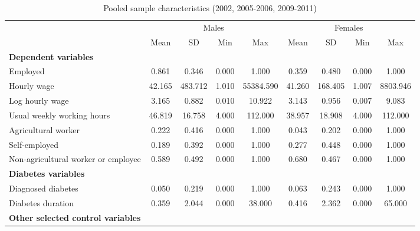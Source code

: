 \documentclass[12pt,english,british]{article}
\newcommand{\sym}[1]{\rlap{#1}}%
\begin{document}
\begin{table}[h]
\caption{\label{tab:Pooled-sample-characteristics }Pooled sample characteristics (2002, 2005-2006, 2009-2011)}
\begin{center}
\begin{adjustbox}{max width=\textwidth}

{ \def\sym#1{\ifmmode^{#1}\else\(^{#1}\)\fi} \begin{tabular}{l*{2}{cccc}}
\toprule
                    &\multicolumn{4}{c}{Males}                          &\multicolumn{4}{c}{Females}                        \\
                    &        Mean&          SD&         Min&         Max&        Mean&          SD&         Min&         Max\\
\midrule
\textbf{Dependent variables} &&&&&&&& \\
Employed            &       0.861&       0.346&       0.000&       1.000&       0.359&       0.480&       0.000&       1.000\\
Hourly wage             &      42.165&     483.712&       1.010&   55384.590&      41.260&     168.405&       1.007&    8803.946\\
Log hourly wage     &       3.165&       0.882&       0.010&      10.922&       3.143&       0.956&       0.007&       9.083\\
Usual weekly working hours&      46.819&      16.758&       4.000&     112.000&      38.957&      18.908&       4.000&     112.000\\
Agricultural worker &       0.222&       0.416&       0.000&       1.000&       0.043&       0.202&       0.000&       1.000\\
Self-employed       &       0.189&       0.392&       0.000&       1.000&       0.277&       0.448&       0.000&       1.000\\
Non-agricultural worker or employee&       0.589&       0.492&       0.000&       1.000&       0.680&       0.467&       0.000&       1.000\\
\textbf{Diabetes variables} &&&&&&&& \\
Diagnosed diabetes  &       0.050&       0.219&       0.000&       1.000&       0.063&       0.243&       0.000&       1.000\\
Diabetes duration   &       0.359&       2.044&       0.000&      38.000&       0.416&       2.362&       0.000&      65.000\\
\textbf{Other selected control variables} &&&&&&&& \\

\end{tabular}}
\end{adjustbox}
\end{center}
\end{table}
\end{document}

